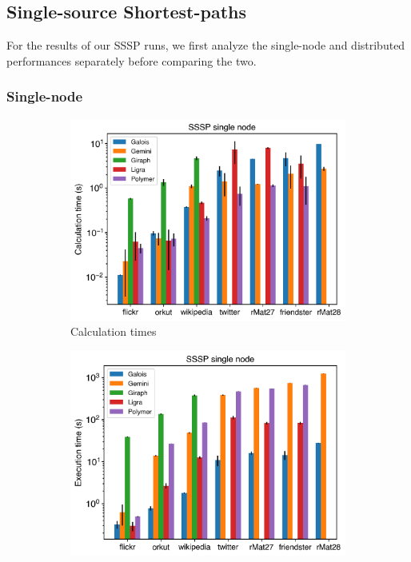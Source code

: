 

\subsection{Single-source Shortest-paths}
For the results of our SSSP runs, we first analyze the single-node and distributed performances separately before comparing the two.

\subsubsection{Single-node}
\begin{figure}
	\begin{subfigure}{0.32\textwidth}
		\includegraphics[width=\linewidth]{../../plots/singleNodeSSSP_calcTime.png}
		\caption{Calculation times}
		\label{fig:singleNodeSSSP_calc}
	\end{subfigure}
	\hfil
	\begin{subfigure}{0.32\textwidth}
		\includegraphics[width=\linewidth]{../../plots/singleNodeSSSP_execTime.png}

\end{subfigure}
\end{figure}
